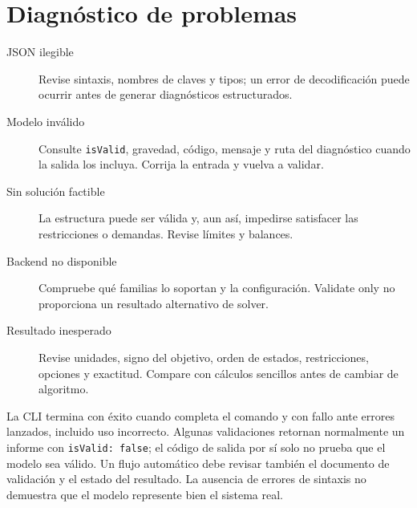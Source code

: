 \section{Diagnóstico de problemas}
\begin{description}
 \item[JSON ilegible] Revise sintaxis, nombres de claves y tipos; un error de
 decodificación puede ocurrir antes de generar diagnósticos estructurados.
 \item[Modelo inválido] Consulte \texttt{isValid}, gravedad, código, mensaje y
 ruta del diagnóstico cuando la salida los incluya. Corrija la entrada y vuelva
 a validar.
 \item[Sin solución factible] La estructura puede ser válida y, aun así,
 impedirse satisfacer las restricciones o demandas. Revise límites y balances.
 \item[Backend no disponible] Compruebe qué familias lo soportan y la
 configuración. Validate only no proporciona un resultado alternativo de solver.
 \item[Resultado inesperado] Revise unidades, signo del objetivo, orden de
 estados, restricciones, opciones y exactitud. Compare con cálculos sencillos
 antes de cambiar de algoritmo.
\end{description}
La CLI termina con éxito cuando completa el comando y con fallo ante errores
lanzados, incluido uso incorrecto. Algunas validaciones retornan normalmente un
informe con \texttt{isValid: false}; el código de salida por sí solo no prueba
que el modelo sea válido. Un flujo automático debe revisar también el documento
de validación y el estado del resultado. La ausencia de errores de sintaxis
no demuestra que el modelo represente bien el sistema real.
